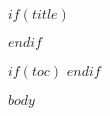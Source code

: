 \documentclass[fontsize=17pt, openany, paper=letter, BCOR=5mm, DIV=15]{scrbook}
\begin{document}
$if(title)$
\maketitle
$endif$

$if(toc)$
\tableofcontents
$endif$

$body$

\end{document}
